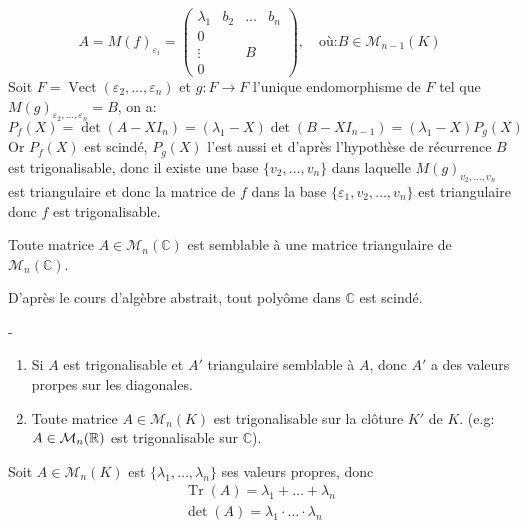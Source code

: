 \begin{preuve}
\begin{itemize}
            \[
            A = M(f)_{\varepsilon_i} = \begin{pmatrix} 
                \lambda_1 & b_2 & \ldots & b_n\\
                0         &     &        &    \\
                \vdots    &     & B      &    \\
                0         &     &        &
            \end{pmatrix}, \quad \text{où:} B \in \mathcal{M}_{n-1}(K)
            \] 
            Soit $F = \operatorname{Vect}(\varepsilon_2, \ldots, \varepsilon_n)$ et $g: F \to F$ l'unique endomorphisme de $F$ tel que  $M(g)_{\varepsilon_2, \ldots, \varepsilon_n} = B$, on a:
            \[
            P_f(X) = \det(A - XI_n) = (\lambda_1 - X)\det(B - XI_{n-1}) = (\lambda_1 - X)P_g(X)
            \] 
            Or $P_f(X)$ est scindé,  $P_g(X)$ l'est aussi et d'après l'hypothèse de récurrence  $B$ est trigonalisable, donc il existe une base  $\{v_2, \ldots, v_n\}$ dans laquelle $M(g)_{v_2, \ldots, v_n}$ est triangulaire et donc la matrice de $f$ dans la base  $\{\varepsilon_1, v_2, \ldots, v_n\}$ est triangulaire donc $f$ est trigonalisable.
   \end{itemize} 
\end{preuve}
\begin{corollary}
    Toute matrice $A \in \mathcal{M}_n(\mathbb{C})$  est semblable à une matrice triangulaire de $\mathcal{M}_n(\mathbb{C})$.
\end{corollary}
\begin{intuition}
    D'après le cours d'algèbre abstrait, tout polyôme dans $\mathbb{C}$ est scindé. 
\end{intuition}
\begin{remark}-
   \begin{enumerate}
       \item Si $A$ est trigonalisable et  $A'$ triangulaire semblable à $A$, donc  $A'$ a des valeurs prorpes sur les diagonales.
       \item Toute matrice $A \in \mathcal{M}_n(K)$ est trigonalisable sur la clôture $K'$ de  $K$. (e.g: $A \in \mathcal{M}_n(\mathbb{R})$ est trigonalisable sur $\mathbb{C}$).
   \end{enumerate} 
\end{remark}
\begin{corollary}
    Soit $A \in \mathcal{M}_n(K)$ est $\{\lambda_1, \ldots, \lambda_n\}$ ses valeurs propres, donc
    \begin{align*}
        \operatorname{Tr}(A) = \lambda_1 + \ldots + \lambda_n\\
        \det(A) = \lambda_1 \cdot \ldots \cdot  \lambda_n
    \end{align*}
\end{corollary}
